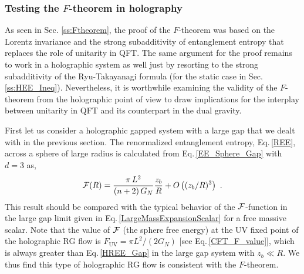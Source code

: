 \subsubsection{Testing the $F$-theorem in holography}
As seen in Sec. \ref{ss:Ftheorem}, the proof of the $F$-theorem was based on the Lorentz invariance and the strong subadditivity of entanglement entropy that replaces the role of unitarity in QFT. 
The same argument for the proof remains to work in a holographic system as well just by resorting to the strong subadditivity of the Ryu-Takayanagi formula (for the static case in Sec. \ref{ss:HEE_Ineq}).
Nevertheless, it is worthwhile examining the validity of the $F$-theorem from  the holographic point of view to draw implications for the interplay between unitarity in QFT and its counterpart in the dual gravity.

First let us consider a holographic gapped system with a large gap
that we dealt with in the previous section.
The renormalized entanglement entropy, Eq.\,\eqref{REE}, across a sphere of large radius is calculated from Eq.\,\eqref{EE_Sphere_Gap} with $d=3$ as,
\begin{align}\label{HREE_Gap}
	{\cal F}(R) = \frac{\pi\,L^2}{(n+2)\,G_N}\frac{z_b}{R} + O\left( (z_b/R)^{3}\right) \ .
\end{align}
This result should be compared with the typical behavior of the ${\cal F}$-function in the large gap limit given in Eq.\,\eqref{LargeMassExpansionScalar} for a free massive scalar.
Note that the value of ${\cal F}$ (the sphere free energy) at the UV fixed point of the holographic RG flow is $F_\text{UV} = \pi L^2/(2G_N)$ [see Eq.\,\eqref{CFT_F_value}], which is always greater than Eq.\,\eqref{HREE_Gap} in the large gap system with $z_b \ll R$.
We thus find this type of holographic RG flow is consistent with the $F$-theorem.


